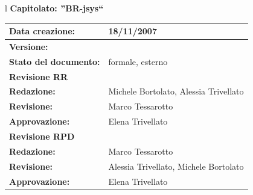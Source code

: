 \documentclass[11pt,titlepage,a4paper]{report}
\begin{document}
\begin{center}
\thispagestyle{plain}
\begin{table}[htbp]
\large{
\begin{tabular}{l}
\Large{\textbf{\textsf{Capitolato: ''BR-jsys``}}} \\
\begin{tabular}{||p{6cm}||p{6cm}||} \hline
\textbf{Data creazione:} & 18/11/2007 \\ \hline
\textbf{Versione:} & \lv \\ \hline
\textbf{Stato del documento:} & formale, esterno \\ \hline
\textbf{Revisione RR} &   \\ \hline
\textbf{Redazione:} & Michele Bortolato, Alessia Trivellato \\ \hline
\textbf{Revisione:} &   Marco Tessarotto \\ \hline
\textbf{Approvazione:}  & Elena Trivellato\\ \hline
\textbf{Revisione RPD} &  \\ \hline 
\textbf{Redazione:} & Marco Tessarotto \\ \hline
\textbf{Revisione:} &  Alessia Trivellato, Michele Bortolato \\ \hline
\textbf{Approvazione:}  & Elena Trivellato \\ \hline
\end{tabular} \\
\end{tabular}
}
\end{table}


\end{center}
\end{document}

